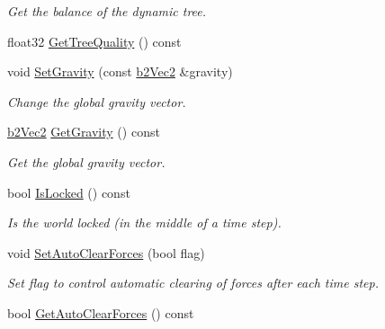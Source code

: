 \begin{DoxyCompactItemize}
\begin{DoxyCompactList}\small\item\em Get the balance of the dynamic tree. \end{DoxyCompactList}\item 
float32 \hyperlink{classb2_world_a0e9dceab7052fd6e0d73d6024cca1bcb}{Get\-Tree\-Quality} () const 
\item 
\hypertarget{classb2_world_aeafa43d6580e1dddb0675e672ca2375c}{void \hyperlink{classb2_world_aeafa43d6580e1dddb0675e672ca2375c}{Set\-Gravity} (const \hyperlink{structb2_vec2}{b2\-Vec2} \&gravity)}\label{classb2_world_aeafa43d6580e1dddb0675e672ca2375c}

\begin{DoxyCompactList}\small\item\em Change the global gravity vector. \end{DoxyCompactList}\item 
\hypertarget{classb2_world_a1e34bcd2f75fbdd41e2d84b3eb26d1ab}{\hyperlink{structb2_vec2}{b2\-Vec2} \hyperlink{classb2_world_a1e34bcd2f75fbdd41e2d84b3eb26d1ab}{Get\-Gravity} () const }\label{classb2_world_a1e34bcd2f75fbdd41e2d84b3eb26d1ab}

\begin{DoxyCompactList}\small\item\em Get the global gravity vector. \end{DoxyCompactList}\item 
\hypertarget{classb2_world_ae50c318304546c9cc066ee382668c4a1}{bool \hyperlink{classb2_world_ae50c318304546c9cc066ee382668c4a1}{Is\-Locked} () const }\label{classb2_world_ae50c318304546c9cc066ee382668c4a1}

\begin{DoxyCompactList}\small\item\em Is the world locked (in the middle of a time step). \end{DoxyCompactList}\item 
\hypertarget{classb2_world_aa2bced28ddef5bbb00ed5666e5e9f620}{void \hyperlink{classb2_world_aa2bced28ddef5bbb00ed5666e5e9f620}{Set\-Auto\-Clear\-Forces} (bool flag)}\label{classb2_world_aa2bced28ddef5bbb00ed5666e5e9f620}

\begin{DoxyCompactList}\small\item\em Set flag to control automatic clearing of forces after each time step. \end{DoxyCompactList}\item 
\hypertarget{classb2_world_af56cc43ebde27946ed39382b4ea31640}{bool \hyperlink{classb2_world_af56cc43ebde27946ed39382b4ea31640}{Get\-Auto\-Clear\-Forces} () const }\label{classb2_world_af56cc43ebde27946ed39382b4ea31640}


\end{DoxyCompactItemize}
